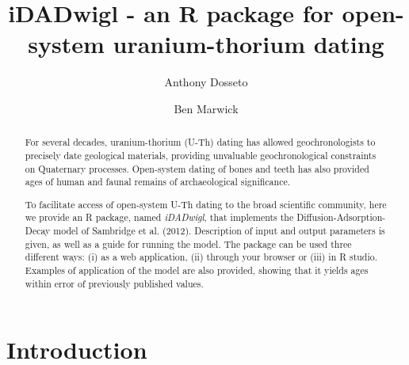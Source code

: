 \documentclass[]{elsarticle} %
\begin{document}
\begin{frontmatter}

  \title{iDADwigl - an R package for open-system uranium-thorium dating}
    \author[University of Wollongong]{Anthony Dosseto}
    \author[University of Washington]{Ben Marwick}
  
      \address[University of Wollongong]{Wollongong Isotope Geochronology Laboratory, School of Earth, Atmosphere \& Life Sciences, University of Wollongong, Wollongong NSW Australia}
    \address[University of Washington]{Department of Anthropology, University of Washington, Seattle, WA, USA}
  
  \begin{abstract}
  For several decades, uranium-thorium (U-Th) dating has allowed geochronologists to precisely date geological materials, providing unvaluable geochronological constraints on Quaternary processes. Open-system dating of bones and teeth has also provided ages of human and faunal remains of archaeological significance.
  
  To facilitate access of open-system U-Th dating to the broad scientific community, here we provide an R package, named \emph{iDADwigl}, that implements the Diffusion-Adsorption-Decay model of Sambridge et al. (2012). Description of input and output parameters is given, as well as a guide for running the model. The package can be used three different ways: (i) as a web application, (ii) through your browser or (iii) in R studio. Examples of application of the model are also provided, showing that it yields ages within error of previously published values.\\
  \end{abstract}
  
 \end{frontmatter}

\newpage
\linenumbers

\hypertarget{introduction}{%
\section{Introduction}\label{introduction}}
\end{document}
